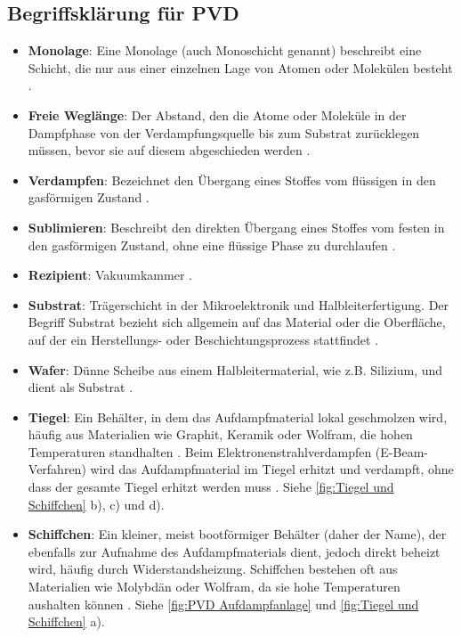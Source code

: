 \documentclass{article} %
\begin{document}
\subsection{Begriffsklärung für PVD} %
\begin{itemize}
    \item \textbf{Monolage}: Eine Monolage (auch Monoschicht genannt) beschreibt eine Schicht, die nur aus einer einzelnen Lage von Atomen oder 
    Molekülen besteht \cite{kittel2004}.
    \item \textbf{Freie Weglänge}: Der Abstand, den die Atome oder Moleküle in der Dampfphase von der Verdampfungsquelle bis zum Substrat 
    zurücklegen müssen, bevor sie auf diesem abgeschieden werden \cite{kittel2004}.
    \item \textbf{Verdampfen}: Bezeichnet den Übergang eines Stoffes vom flüssigen in den gasförmigen Zustand \cite{kittel2004}.
    \item \textbf{Sublimieren}: Beschreibt den direkten Übergang eines Stoffes vom festen in den gasförmigen Zustand, ohne eine flüssige Phase 
    zu durchlaufen \cite{kittel2004}.
    \item \textbf{Rezipient}: Vakuumkammer \cite{keplinger2024, ohring2002}.
    \item \textbf{Substrat}: Trägerschicht in der Mikroelektronik und Halbleiterfertigung. Der Begriff Substrat bezieht sich allgemein auf das 
    Material oder die Oberfläche, auf der ein Herstellungs- oder Beschichtungsprozess stattfindet \cite{ohring2002}.
    \item \textbf{Wafer}: Dünne Scheibe aus einem Halbleitermaterial, wie z.B. Silizium, und dient als Substrat \cite{sze2006}.
    \item \textbf{Tiegel}: Ein Behälter, in dem das Aufdampfmaterial lokal geschmolzen wird, häufig aus Materialien wie Graphit, Keramik oder 
    Wolfram, die hohen Temperaturen standhalten \cite{smith1995, ohring2002}. Beim Elektronenstrahlverdampfen (E-Beam-Verfahren) wird das 
    Aufdampfmaterial im Tiegel erhitzt und verdampft, ohne dass der gesamte Tiegel erhitzt werden muss \cite{smith1995}. Siehe \autoref{fig:Tiegel und Schiffchen} b), c) und d).
    \item \textbf{Schiffchen}: Ein kleiner, meist bootförmiger Behälter (daher der Name), der ebenfalls zur Aufnahme des Aufdampfmaterials dient, 
    jedoch direkt beheizt wird, häufig durch Widerstandsheizung. Schiffchen bestehen oft aus Materialien wie Molybdän oder Wolfram, da sie hohe 
    Temperaturen aushalten können \cite{mattox1998, ohring2002}. Siehe \autoref{fig:PVD Aufdampfanlage} und \autoref{fig:Tiegel und Schiffchen} a).
\end{itemize}
\end{document}
